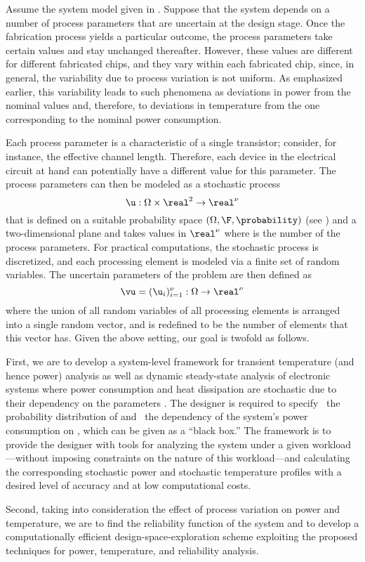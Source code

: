 Assume the system model given in . Suppose that the system
depends on a number of process parameters that are uncertain at the design
stage. Once the fabrication process yields a particular outcome, the process
parameters take certain values and stay unchanged thereafter. However, these
values are different for different fabricated chips, and they vary within each
fabricated chip, since, in general, the variability due to process variation is
not uniform. As emphasized earlier, this variability leads to such phenomena as
deviations in power from the nominal values and, therefore, to deviations in
temperature from the one corresponding to the nominal power consumption.

Each process parameter is a characteristic of a single transistor; consider, for
instance, the effective channel length. Therefore, each device in the electrical
circuit at hand can potentially have a different value for this parameter. The
process parameters can then be modeled as a stochastic process
\[
  \u: \Omega \times \real^2 \to \real^\nu
\]
that is defined on a suitable probability space $(\Omega, \F, \probability)$
(see ) and a two-dimensional plane and takes values in
$\real^\nu$ where \nu is the number of the process parameters. For practical
computations, the stochastic process is discretized, and each processing element
is modeled via a finite set of random variables. The uncertain parameters of the
problem are then defined as
\[
  \vu = (\u_i)_{i = 1}^\nu: \Omega \to \real^\nu
\]
where the union of all random variables of all processing elements is arranged
into a single random vector, and \nu is redefined to be the number of elements
that this vector has. Given the above setting, our goal is twofold as follows.

First, we are to develop a system-level framework for transient temperature (and
hence power) analysis as well as dynamic steady-state analysis of electronic
systems where power consumption and heat dissipation are stochastic due to their
dependency on the parameters \vu. The designer is required to specify \one~the
probability distribution of \vu and \two~the dependency of the system's power
consumption on \vu, which can be given as a ``black box.'' The framework is to
provide the designer with tools for analyzing the system under a given
workload---without imposing constraints on the nature of this workload---and
calculating the corresponding stochastic power \mp and stochastic temperature
\mq profiles with a desired level of accuracy and at low computational costs.

Second, taking into consideration the effect of process variation on power and
temperature, we are to find the reliability function of the system and to
develop a computationally efficient design-space-exploration scheme exploiting
the proposed techniques for power, temperature, and reliability analysis.
